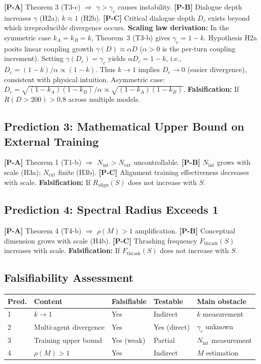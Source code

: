 \documentclass[12pt,a4paper]{article}
\theoremstyle{definition}
\newcommand{\Nint}{N_{\mathrm{int}}}
\newcommand{\Next}{N_{\mathrm{ext}}}
\newcommand{\gamc}{\gamma_c}
\begin{document}
\textbf{[P-A]} Theorem 3 (T3-c) $\Rightarrow$ $\gamma > \gamc$ causes instability. \textbf{[P-B]} Dialogue depth increases $\gamma$ (H2a); $k \approx 1$ (H2b). \textbf{[P-C]} Critical dialogue depth $D_c$ exists beyond which irreproducible divergence occurs. \textbf{Scaling law derivation:} In the symmetric case $k_A = k_B = k$, Theorem~3 (T3-b) gives $\gamc = 1-k$. Hypothesis H2a posits linear coupling growth $\gamma(D) \approx \alpha D$ ($\alpha > 0$ is the per-turn coupling increment). Setting $\gamma(D_c) = \gamc$ yields $\alpha D_c = 1-k$, i.e., $D_c = (1-k)/\alpha \propto (1-k)$. Thus $k \to 1$ implies $D_c \to 0$ (easier divergence), consistent with physical intuition. Asymmetric case: $D_c = \sqrt{(1-k_A)(1-k_B)}/\alpha \propto \sqrt{(1-k_A)(1-k_B)}$. \textbf{Falsification:} If $R(D > 200) > 0.8$ across multiple models.

\subsection{Prediction 3: Mathematical Upper Bound on External Training}

\textbf{[P-A]} Theorem 1 (T1-b) $\Rightarrow$ $\Nint > \Next$ uncontrollable. \textbf{[P-B]} $\Nint$ grows with scale (H3a); $\Next$ finite (H3b). \textbf{[P-C]} Alignment training effectiveness decreases with scale. \textbf{Falsification:} If $R_{\mathrm{align}}(S)$ does not increase with $S$.

\subsection{Prediction 4: Spectral Radius Exceeds 1}

\textbf{[P-A]} Theorem 4 (T4-b) $\Rightarrow$ $\rho(M) > 1$ amplification. \textbf{[P-B]} Conceptual dimension grows with scale (H4b). \textbf{[P-C]} Thrashing frequency $F_{\mathrm{thrash}}(S)$ increases with scale. \textbf{Falsification:} If $F_{\mathrm{thrash}}(S)$ does not increase with $S$.

\subsection{Falsifiability Assessment}

\begin{longtable}{p{} p{} p{} p{} p{}}
\toprule
Pred. & Content & Falsifiable & Testable & Main obstacle \\
\midrule
1 & $k \to 1$ & Yes & Indirect & $k$ measurement \\
2 & Multi-agent divergence & Yes & Yes (direct) & $\gamc$ unknown \\
3 & Training upper bound & Yes (weak) & Partial & $\Nint$ measurement \\
4 & $\rho(M) > 1$ & Yes & Indirect & $M$ estimation \\
\bottomrule
\end{longtable}
\end{document}
